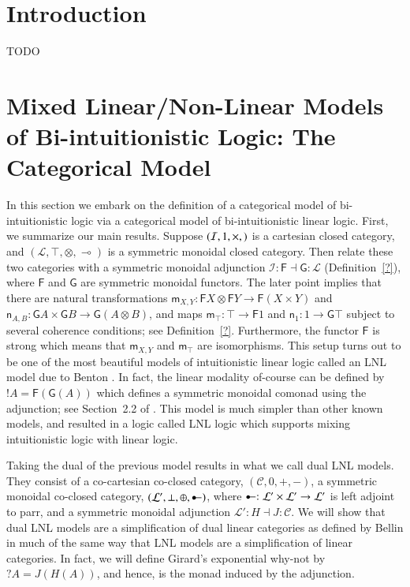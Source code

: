 \documentclass{lmcs}
\let\mto\to
\let\to\relax
\newcommand{\to}{\rightarrow}
\newcommand{\cat}[1]{\mathcal{#1}}
\newcommand{\func}[1]{\mathsf{#1}}
\newcommand{\limp}[0]{\multimap}
\newcommand{\colimp}[0]{\multimapdotinv}
\newcommand{\m}[0]{\mathsf{m}}
\newcommand{\n}[0]{\mathsf{n}}
\begin{document}
\section{Introduction}
\label{sec:introduction}
TODO \cite{?}

\section{Mixed Linear/Non-Linear Models of Bi-intuitionistic Logic: The Categorical Model}
\label{sec:the_categorical_model}

In this section we embark on the definition of a categorical model of
bi-intuitionistic logic via a categorical model of bi-intuitionistic
linear logic.  First, we summarize our main results.  Suppose
$(\cat{I}, 1, \times, \to)$ is a cartesian closed category, and
$(\cat{L}, \top, \otimes, \limp)$ is a symmetric monoidal closed
category.  Then relate these two categories with a symmetric monoidal
adjunction $\cat{I} : \func{F} \dashv \func{G} : \cat{L}$
(Definition~\ref{?}), where $\func{F}$ and $\func{G}$ are symmetric
monoidal functors.  The later point implies that there are natural
transformations $\m_{X,Y} : \func{F}X \otimes \func{F}Y \mto
\func{F}(X \times Y)$ and $\n_{A,B} : \func{G}A \times \func{G}B \mto
\func{G}(A \otimes B)$, and maps $\m_\top : \top \mto \func{F}1$ and
$\n_1 : 1 \mto \func{G}\top$ subject to several coherence conditions;
see Definition~\ref{?}.  Furthermore, the functor $\func{F}$ is strong
which means that $\m_{X,Y}$ and $\m_{\top}$ are isomorphisms.  This
setup turns out to be one of the most beautiful models of
intuitionistic linear logic called an LNL model due to Benton
\cite{Benton:1994}.  In fact, the linear modality of-course can be
defined by $!A = \func{F}(\func{G}(A))$ which defines a symmetric
monoidal comonad using the adjunction; see Section~2.2 of
\cite{Benton:1994}.  This model is much simpler than other known
models, and resulted in a logic called LNL logic which supports mixing
intuitionistic logic with linear logic.

Taking the dual of the previous model results in what we call dual LNL
models. They consist of a co-cartesian co-closed category, $(\cat{C},
0, +, -)$, a symmetric monoidal co-closed category, $(\cat{L}', \perp,
\oplus, \colimp)$, where $\colimp : \cat{L}' \times \cat{L}' \mto
\cat{L}'$ is left adjoint to parr, and a symmetric monoidal adjunction
$\cat{L'} : H \dashv J : \cat{C}$.  We will show that dual LNL models
are a simplification of dual linear categories as defined by Bellin
\cite{Bellin:2012} in much of the same way that LNL models are a
simplification of linear categories.  In fact, we will define Girard's
exponential why-not by $? A = J(H(A))$, and hence, is the monad
induced by the adjunction.
\end{document}
